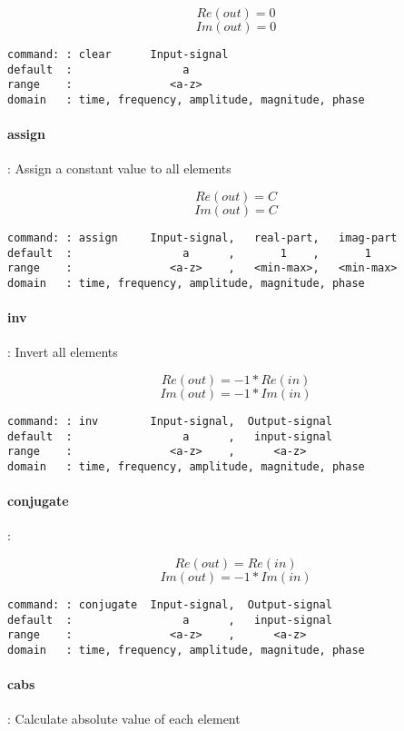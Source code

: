 \documentclass{report}
\newcommand{\bc}{\scriptsize}
\newcommand{\ec}{\normalsize}
\begin{document}
\[ Re(out) = 0 \]
\[ Im(out) = 0 \]

\bc
\begin{verbatim}
command: : clear      Input-signal
default  :                 a      
range    :               <a-z>    
domain   : time, frequency, amplitude, magnitude, phase
\end{verbatim}
\ec

\paragraph{assign}: Assign a constant value to all elements

\[ Re(out) = C \]
\[ Im(out) = C \]

\bc
\begin{verbatim}
command: : assign     Input-signal,   real-part,   imag-part
default  :                 a      ,       1    ,       1
range    :               <a-z>    ,   <min-max>,   <min-max>
domain   : time, frequency, amplitude, magnitude, phase
\end{verbatim}
\ec


\paragraph{inv}: Invert all elements

\[ Re(out) = -1*Re(in) \]
\[ Im(out) = -1*Im(in) \]

\bc
\begin{verbatim}
command: : inv        Input-signal,  Output-signal
default  :                 a      ,   input-signal  
range    :               <a-z>    ,      <a-z>
domain   : time, frequency, amplitude, magnitude, phase
\end{verbatim}
\ec

\paragraph{conjugate}: 

\[ Re(out) = Re(in) \]
\[ Im(out) = -1*Im(in) \]

\bc
\begin{verbatim}
command: : conjugate  Input-signal,  Output-signal
default  :                 a      ,   input-signal  
range    :               <a-z>    ,      <a-z>
domain   : time, frequency, amplitude, magnitude, phase
\end{verbatim}
\ec

\paragraph{cabs}: Calculate absolute value of each element
\end{document}
